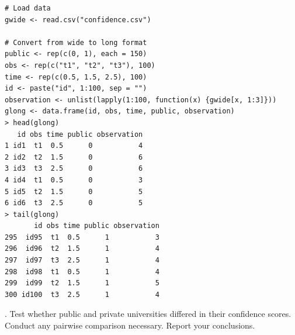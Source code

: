 \documentclass[onecolumn,10pt]{jhwhw}
\begin{document}






\begin{lstlisting}
# Load data
gwide <- read.csv("confidence.csv")

# Convert from wide to long format
public <- rep(c(0, 1), each = 150)
obs <- rep(c("t1", "t2", "t3"), 100)
time <- rep(c(0.5, 1.5, 2.5), 100)
id <- paste("id", 1:100, sep = "")
observation <- unlist(lapply(1:100, function(x) {gwide[x, 1:3]}))
glong <- data.frame(id, obs, time, public, observation)
> head(glong)
   id obs time public observation
1 id1  t1  0.5      0           4
2 id2  t2  1.5      0           6
3 id3  t3  2.5      0           6
4 id4  t1  0.5      0           3
5 id5  t2  1.5      0           5
6 id6  t3  2.5      0           5
> tail(glong)
       id obs time public observation
295  id95  t1  0.5      1           3
296  id96  t2  1.5      1           4
297  id97  t3  2.5      1           4
298  id98  t1  0.5      1           4
299  id99  t2  1.5      1           5
300 id100  t3  2.5      1           4
\end{lstlisting}


. Test whether public and private universities differed in their confidence scores. Conduct any pairwise comparison necessary. Report your conclusions.\\
\end{document}
